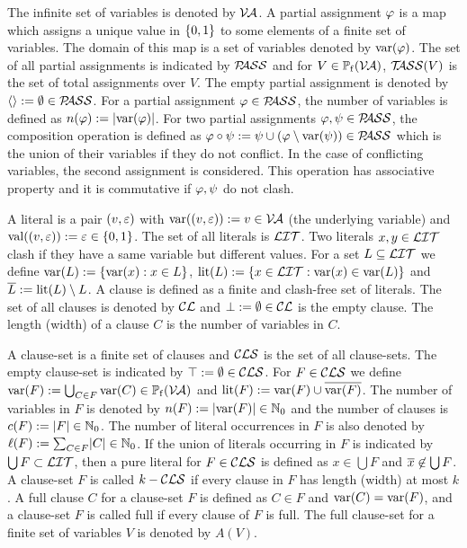 \documentclass{report}
\begin{document}
The infinite set of variables is denoted by $\mathcal{V\hspace{-0.1em}A}$. A partial assignment $\varphi$ is a map which assigns a unique value in $\{ 0,1 \}$ to some elements of a finite set of variables. The domain of this map is a set of variables denoted by $\operatorname{var}(\varphi)$. The set of all partial assignments is indicated by $\mathcal{P\hspace{-0.32em}ASS}$ and for $V \in \operatorname{\mathbb{P}_f}(\mathcal{V\hspace{-0.1em}A})$, $\mathcal{T\hspace{-0.35em}ASS}(V)$ is the set of total assignments over $V$. The empty partial assignment is denoted by $\langle  \rangle:= \emptyset \in \mathcal{P\hspace{-0.32em}ASS}$. For a partial assignment $\varphi \in \mathcal{P\hspace{-0.32em}ASS}$, the number of variables is defined as $n(\varphi):=\lvert \operatorname{var}(\varphi) \rvert$. For two partial assignments $\varphi, \psi \in \mathcal{P\hspace{-0.32em}ASS}$, the composition operation is defined as $\varphi \circ \psi := \psi \cup (\varphi \setminus \operatorname{var}(\psi)) \in \mathcal{P\hspace{-0.32em}ASS}$ which is the union of their variables if they do not conflict. In the case of conflicting variables, the second assignment is considered. This operation has associative property and it is commutative if $\varphi, \psi$ do not clash.

A literal is a pair $(v,\varepsilon)$ with $\operatorname{var}((v,\varepsilon)):=v \in \mathcal{V\hspace{-0.1em}A}$ (the underlying variable) and $\operatorname{val}((v,\varepsilon)):=\varepsilon \in \{ 0,1 \}$. The set of all literals is $\mathcal{LIT}$. Two literals $x, y \in \mathcal{LIT}$ clash if they have a same variable but different values. For a set $L \subseteq \mathcal{LIT}$ we define $\operatorname{var}(L) := \{ \operatorname{var}(x) :x \in L \}$, $\operatorname{lit}(L):= \{ x \in \mathcal{LIT} : \operatorname{var}(x) \in \operatorname{var}(L) \}$ and $\overline{L} := \operatorname{lit}(L) \setminus L$. A clause is defined as a finite and clash-free set of literals. The set of all clauses is denoted by $\mathcal{CL}$ and $\bot := \emptyset \in \mathcal{CL}$ is the empty clause. The length (width) of a clause $C$ is the number of variables in $C$.

A clause-set is a finite set of clauses and $\mathcal{CLS}$ is the set of all clause-sets. The empty clause-set is indicated by $\top := \emptyset \in \mathcal{CLS}$. For $F \in \mathcal{CLS}$ we define $\operatorname{var}(F) := \bigcup_{C \in F} \operatorname{var}(C) \in \operatorname{\mathbb{P}_f}(\mathcal{V\hspace{-0.1em}A})$ and $\operatorname{lit}(F) := \operatorname{var}(F) \cup \overline{\operatorname{var}(F)}$. The number of variables in $F$ is denoted by $n(F) := \lvert \operatorname{var}(F) \rvert \in \mathbb{N}_0$ and the number of clauses is $c(F) := \lvert F \rvert \in \mathbb{N}_0$. The number of literal occurrences in $F$ is also denoted by $\ell(F) := \sum_{C \in F} \lvert C \rvert \in \mathbb{N}_0$. If the union of literals occurring in $F$ is indicated by $\bigcup F \subset \mathcal{LIT}$, then a pure literal for $F \in \mathcal{CLS}$ is defined as $x \in \bigcup F$ and $\overline{x} \not \in \bigcup F$. A clause-set $F$ is called $k-\mathcal{CLS}$ if every clause in $F$ has length (width) at most $k$. A full clause $C$  for a clause-set $F$ is defined as $C \in F$ and $\operatorname{var}(C) = \operatorname{var}(F)$, and a clause-set $F$ is called full if every clause of $F$ is full. The full clause-set for a finite set of variables $V$ is denoted by $A(V)$. 
\end{document}
